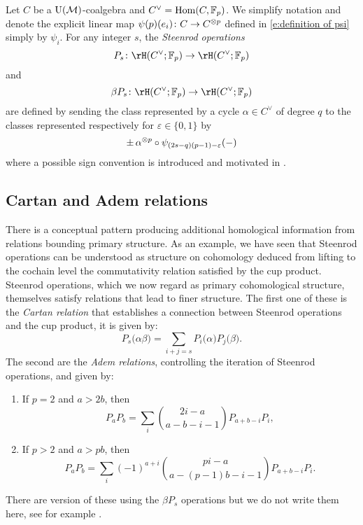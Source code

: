 Let $C$ be a ${\operatorname{U}(\mathcal{M})}$-coalgebra and $C^\vee = \mathrm{Hom}(C, {\mathbb{F}_p})$.
We simplify notation and denote the explicit linear map $\psi(p)(e_i) \colon C \to C^{\otimes p}$ defined in \eqref{e:definition of psi} simply by $\psi_i$.
For any integer $s$, the \textit{Steenrod operations}
\begin{equation*}
P_s \colon \rH(C^\vee; \Fp) \to \rH(C^\vee; \Fp)
\end{equation*}
and
\begin{equation*}
\beta P_s \colon \rH(C^\vee; \Fp) \to \rH(C^\vee; \Fp)
\end{equation*}
are defined by sending the class represented by a cycle $\alpha \in C^\vee$ of degree $q$ to the classes represented respectively for $\varepsilon \in \{0,1\}$ by
\begin{equation*}
\pm \, \alpha^{\otimes p} \circ \psi_{(2s-q)(p-1)-\varepsilon}(-)
\end{equation*}
where a possible sign convention is introduced and motivated in \cite[(6.1)]{steenrod1953cyclic}.

\subsection{Cartan and Adem relations}

There is a conceptual pattern producing additional homological information from relations bounding primary structure.
As an example, we have seen that Steenrod operations can be understood as structure on cohomology deduced from lifting to the cochain level the commutativity relation satisfied by the cup product.
Steenrod operations, which we now regard as primary cohomological structure, themselves satisfy relations that lead to finer structure.
The first one of these is the \textit{Cartan relation} that establishes a connection between Steenrod operations and the cup product, it is given by:
\begin{equation*}
P_s\big(\alpha \beta \big) = \sum_{i+j=s} P_i\big( \alpha \big) P_j\big( \beta \big).
\end{equation*}
The second are the \textit{Adem relations}, controlling the iteration of Steenrod operations, and given by:
\begin{enumerate}
	\item If $p = 2$ and $a > 2b$, then
	\begin{equation*}
	P_{a} P_{b} = \sum_i \binom{2i-a}{a-b-i-1} P_{a+b-i}P_i,
	\end{equation*}
	\item If $p > 2$ and $a > pb$, then
	\begin{equation*}
	P_{a} P_{b} = \sum_i (-1)^{a+i} \binom{pi-a}{a-(p-1)b-i-1} P_{a+b-i}P_i.
	\end{equation*}
\end{enumerate}
There are version of these using the $\beta P_s$ operations but we do not write them here, see for example \cite{may1970general}.

